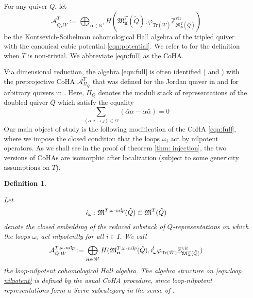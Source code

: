 \documentclass{amsart}
\newtheorem{definition}[theorem]{Definition}
\DeclareMathOperator{\Tr}{\mathrm{Tr}}
\def\vir{\mathrm{vir}}
\def\bn{{\boldsymbol{n}}}
\def\edge{\Omega}
\def\dalpha{\bar{\alpha}}
\def\dQ{\bar{Q}}
\def\tQ{\tilde{Q}}
\def\tW{\tilde{W}}
\def\kh{\mathcal{A}^{T}_{\tQ,\tW}}
\def\ekha{\mathcal{A}^{T,\omega\emph{-nilp}}_{\tQ,\tW}}
\begin{document}
For any quiver $Q$, let  
\begin{equation}
\label{eqn:full}
\kh:= \bigoplus_{\bn \in \mathbb{N}^{I}} H(\mathfrak{M}_{\bn}^T(\tilde{Q}),\varphi_{\mathrm{Tr}(\tilde{W})}\mathbb{Z}^{\vir}_{\mathfrak{M}_{\bn}^T(\tilde{Q})}) 
\end{equation}
be the Kontsevich-Soibelman cohomological Hall algebra \cite{KS} of the tripled quiver with the canonical cubic potential \eqref{eqn:potential}. We refer to \cite{davison2022integrality} for the definition when $T$ is non-trivial. We abbreviate \eqref{eqn:full} as the CoHA. 
\medskip 

Via dimensional reduction, the algebra \eqref{eqn:full} is often identified (\cite[Appendix]{Ren:2015zua} and \cite{Yang_2019}) with the preprojective CoHA $\mathcal{A}^T_{\Pi_Q}$ that was defined for the Jordan quiver in \cite{schiffmann2012cherednik} and for arbitrary quivers in \cite{Yang_2018}. Here, $\Pi_Q$ denotes the moduli stack of representations of the doubled quiver $\dQ$ which satisfy the equality
$$
\sum_{(\alpha: i \rightarrow j) \in \edge} (\dalpha \alpha - \alpha \dalpha) = 0
$$
Our main object of study is the following modification of the CoHA \eqref{eqn:full}, where we impose the closed condition that the loops $\omega_i$ act by nilpotent operators. As we shall see in the proof of theorem \ref{thm: injection}, the two versions of CoHAs are isomorphic after localization (subject to some genericity assumptions on $T$).


\medskip

\begin{definition}
\label{def:loop nilpotent}

Let 
\begin{equation}
\label{eqn:closed embedding}
i_{\omega} : \mathfrak{M}^{T, \omega\emph{-nilp}}(\tilde{Q}) \subset \mathfrak{M}^{T}(\tilde{Q})
\end{equation}
denote the closed embedding of the reduced substack of $\tilde{Q}$-representations on which the loops $\omega_i$ act nilpotently for all $i \in I$. We call 
\begin{equation}
\label{eqn:loop nilpotent}
\ekha := \bigoplus_{\bn \in \mathbb{N}^{I}}  H(\mathfrak{M}^{T, \omega\emph{-nilp}}_{\bn}(\tilde{Q}), i^{!}_{\omega}\varphi_{\Tr(\tilde{W})}\mathbb{Z}^{\vir}_{\mathfrak{M}_{\bn}^T(\tilde{Q})}) 
\end{equation} 
the loop-nilpotent cohomological Hall algebra. The algebra structure on \eqref{eqn:loop nilpotent} is defined by the usual CoHA procedure, since loop-nilpotent representations form a Serre subcategory in the sense of \cite{davison2020cohomological}. 


\end{definition}
\end{document}
